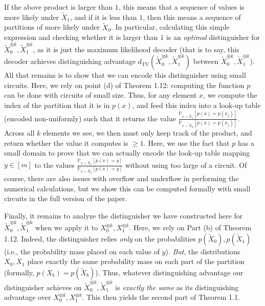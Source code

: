 If the above product is larger than $1$, this means that a sequence of values is more likely under $\widetilde{X}_{1}$, and if it is less than $1$, then this means a sequence of partitions of more likely under $\widetilde{X}_{0}$. In particular, calculating this simple expression and checking whether it is larger than $1$ is an \emph{optimal} distinguisher for $\widetilde{X}^{\otimes k}_{0},\widetilde{X}^{\otimes k}_{1}$, as it is just the maximum likelihood decoder (that is to say, this decoder achieves distinguishing advantage $d_{\mathrm{TV}}(\widetilde{X}_{0}^{\otimes k},\widetilde{X}_{1}^{\otimes k})$ between $\widetilde{X}^{\otimes k}_{0},\widetilde{X}^{\otimes k}_{1}$). All that remains is to show that we can encode this distinguisher using small circuits. Here, we rely on point (d) of Theorem 1.12: computing the function $p$ can be done with circuits of small size. Thus, for any element $x$, we compute the index of the partition that it is in $p(x)$, and feed this index into a look-up table (encoded non-uniformly) such that it returns the value $\frac{\mathbb{P}_{x\sim\widetilde{X}_{1}}[p(x)=p(x_{j})]}{\mathbb{P}_{x\sim\widetilde{X}_{0}}[p(x)=p(x_{j})]}$. Across all $k$ elements we see, we then must only keep track of the product, and return whether the value it computes is $\geq 1$. Here, we use the fact that $p$ has a small domain to prove that we can actually encode the look-up table mapping $y\in[m]$ to the values $\frac{\mathbb{P}_{x\sim\widetilde{X}_{1}}[p(x)=y]}{\mathbb{P}_{x\sim\widetilde{X}_{0}}[p(x)=y]}$ without using too large of a circuit. Of course, there are also issues with overflow and underflow in performing the numerical calculations, but we show this can be computed formally with small circuits in the full version of the paper.\par




Finally, it remains to analyze the distinguisher we have constructed here for $\widetilde{X}^{\otimes k}_{0},\widetilde{X}^{\otimes k}_{1}$ when we apply it to $X_{0}^{\otimes k},X_{1}^{\otimes k}$. Here, we rely on Part (b) of Theorem 1.12. Indeed, the distinguisher relies \emph{only} on the probabilities $p(\widetilde{X}_{0}),p(\widetilde{X}_{1})$ (i.e., the probability mass placed on each value of $y$). \emph{But}, the distributions $X_{0},X_{1}$ place exactly the same probability mass on each part of the partition (formally, $p(X_{b})=p(\widetilde{X}_{b})$). Thus, whatever distinguishing advantage our distinguisher achieves on $\widetilde{X}^{\otimes k}_{0},\widetilde{X}^{\otimes k}_{1}$ is \emph{exactly the same} as its distinguishing advantage over $X_{0}^{\otimes k},X_{1}^{\otimes k}$. This then yields the second part of Theorem 1.1.\par




